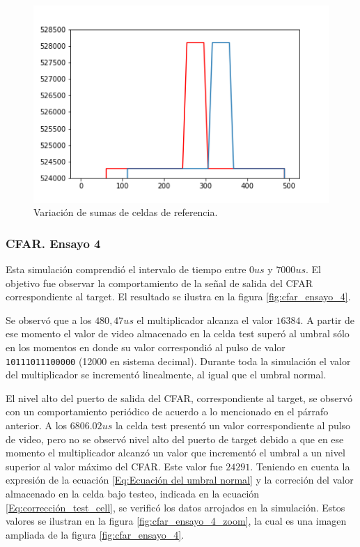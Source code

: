 \begin{figure}
\centering
\includegraphics[scale=0.5]{./Figures/cfar_ensayo_3_sumas.png}
\caption{Variación de sumas de celdas de referencia.}
\label{fig:sumas_celdas}
\end{figure}



\subsubsection{CFAR. Ensayo 4}
\label{Subsec:CFAR. Ensayo 4}

Esta simulación comprendió el intervalo de tiempo entre $0 us$ y $7000 us$. El objetivo fue observar la comportamiento de la señal de salida del CFAR correspondiente al target. El resultado se ilustra en la figura \ref{fig:cfar_ensayo_4}.

Se observó que a los $480,47 us$ el multiplicador alcanza el valor $16384$. A partir de ese momento el valor de video almacenado en la celda test superó al umbral sólo en los momentos en donde su valor correspondió al pulso de valor \texttt{10111011100000} (12000 en sistema decimal). Durante toda la simulación el valor del multiplicador se incrementó linealmente, al igual que el umbral normal.

El nivel alto del puerto de salida del CFAR, correspondiente al target, se observó con un comportamiento periódico de acuerdo a lo mencionado en el párrafo anterior. A los $6806.02 us$ la celda test presentó un valor correspondiente al pulso de video, pero no se observó nivel alto del puerto de target debido a que en ese momento el multiplicador alcanzó un valor que incrementó el umbral a un nivel superior al valor máximo del CFAR. Este valor fue $24291$. Teniendo en cuenta la expresión de la ecuación \ref{Eq:Ecuación del umbral normal} y la correción del valor almacenado en la celda bajo testeo, indicada en la ecuación \ref{Eq:corrección_test_cell}, se verificó los datos arrojados en la simulación. Estos valores se ilustran en la figura \ref{fig:cfar_ensayo_4_zoom}, la cual es una imagen ampliada de la figura \ref{fig:cfar_ensayo_4}.

